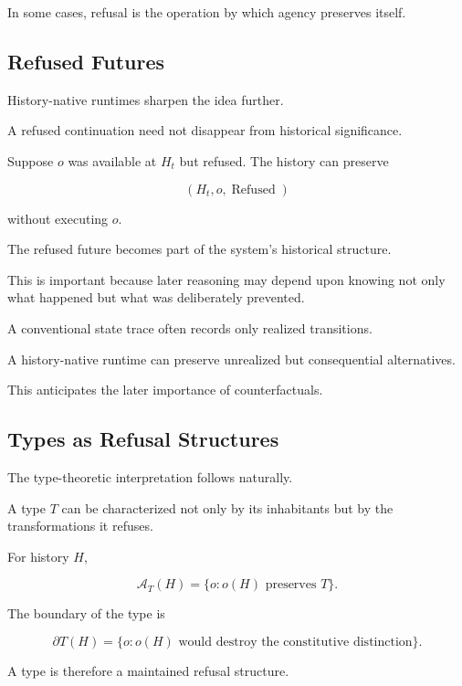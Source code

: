 \documentclass[11pt]{article}
\theoremstyle{remark}
\newcommand{\Adm}{\mathcal{A}}
\begin{document}
In some cases, refusal is the operation by which agency preserves itself.

\subsection{Refused Futures}

History-native runtimes sharpen the idea further.

A refused continuation need not disappear from historical significance.

Suppose $o$ was available at $H_t$ but refused. The history can preserve

\begin{equation}
(H_t,o,\operatorname{Refused})
\end{equation}

without executing $o$.

The refused future becomes part of the system's historical structure.

This is important because later reasoning may depend upon knowing not only what happened but what was deliberately prevented.

A conventional state trace often records only realized transitions.

A history-native runtime can preserve unrealized but consequential alternatives.

This anticipates the later importance of counterfactuals.

\subsection{Types as Refusal Structures}

The type-theoretic interpretation follows naturally.

A type $T$ can be characterized not only by its inhabitants but by the transformations it refuses.

For history $H$,

\begin{equation}
\Adm_T(H)
=
\{o:o(H)\text{ preserves }T\}.
\end{equation}

The boundary of the type is

\begin{equation}
\partial T(H)
=
\{o:o(H)\text{ would destroy the constitutive distinction}\}.
\end{equation}

A type is therefore a maintained refusal structure.
\end{document}
